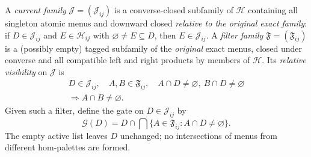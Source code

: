 \begin{definition}
\label{def:typed-filter}
A \emph{current family} $\mathcal J=(\mathcal J_{ij})$ is a
converse-closed subfamily of $\mathcal H$ containing all singleton
atomic menus and downward closed \emph{relative to the original exact
family}: if $D\in\mathcal J_{ij}$ and
$E\in\mathcal H_{ij}$ with $\varnothing\ne E\subseteq D$,
then $E\in\mathcal J_{ij}$.  A \emph{filter family}
$\mathfrak F=(\mathfrak F_{ij})$ is a (possibly empty) tagged
subfamily of the \emph{original} exact menus, closed under converse
and all compatible left and right products by members of
$\mathcal H$.  Its \emph{relative visibility} on $\mathcal J$ is
\begin{equation}\label{eq:relative-visibility}
 \begin{gathered}
 D\in\mathcal J_{ij},\quad A,B\in\mathfrak F_{ij},
 \quad A\cap D\ne\varnothing,\ B\cap D\ne\varnothing\\
 \Longrightarrow A\cap B\ne\varnothing.
 \end{gathered}
\end{equation}
Given such a filter, define the gate on $D\in\mathcal J_{ij}$ by
\begin{equation}\label{eq:typed-gate}
 \mathcal G(D)=D\cap\bigcap\{A\in\mathfrak F_{ij}:
                                    A\cap D\ne\varnothing\}.
\end{equation}
The empty active list leaves $D$ unchanged; no intersections of
menus from different hom-palettes are formed.
\end{definition}

